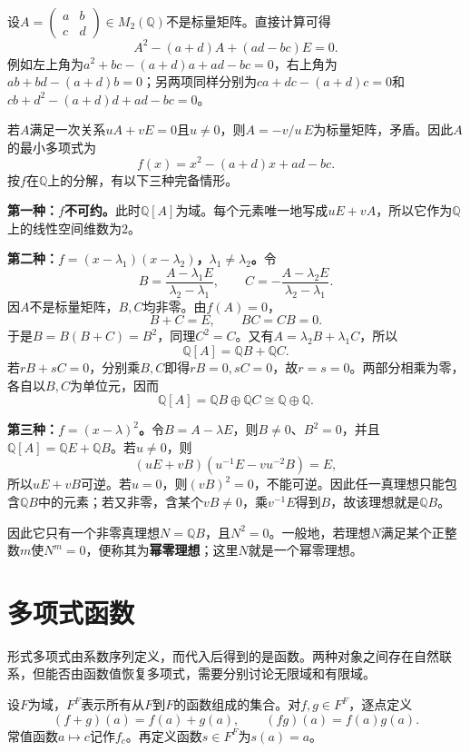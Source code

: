 \begin{example}
设$A=\begin{pmatrix}a&b\\c&d\end{pmatrix}\in M_2(\mathbb Q)$不是标量矩阵。直接计算可得
\[
A^2-(a+d)A+(ad-bc)E=0.
\]
例如左上角为$a^2+bc-(a+d)a+ad-bc=0$，右上角为$ab+bd-(a+d)b=0$；另两项同样分别为$ca+dc-(a+d)c=0$和$cb+d^2-(a+d)d+ad-bc=0$。

若$A$满足一次关系$uA+vE=0$且$u\ne0$，则$A=-v/u\,E$为标量矩阵，矛盾。因此$A$的最小多项式为
\[
f(x)=x^2-(a+d)x+ad-bc.
\]
按$f$在$\mathbb Q$上的分解，有以下三种完备情形。

\textbf{第一种：$f$不可约。}此时$\mathbb Q[A]$为域。每个元素唯一地写成$uE+vA$，所以它作为$\mathbb Q$上的线性空间维数为$2$。

\textbf{第二种：$f=(x-\lambda_1)(x-\lambda_2)$，$\lambda_1\ne\lambda_2$。}令
\[
B=\frac{A-\lambda_1E}{\lambda_2-\lambda_1},\qquad
C=-\frac{A-\lambda_2E}{\lambda_2-\lambda_1}.
\]
因$A$不是标量矩阵，$B,C$均非零。由$f(A)=0$，
\[
B+C=E,\qquad BC=CB=0.
\]
于是$B=B(B+C)=B^2$，同理$C^2=C$。又有$A=\lambda_2B+\lambda_1C$，所以
\[
\mathbb Q[A]=\mathbb QB+\mathbb QC.
\]
若$rB+sC=0$，分别乘$B,C$即得$rB=0,sC=0$，故$r=s=0$。两部分相乘为零，各自以$B,C$为单位元，因而
\[
\mathbb Q[A]=\mathbb QB\oplus\mathbb QC\cong\mathbb Q\oplus\mathbb Q.
\]

\textbf{第三种：$f=(x-\lambda)^2$。}令$B=A-\lambda E$，则$B\ne0$、$B^2=0$，并且$\mathbb Q[A]=\mathbb QE+\mathbb QB$。若$u\ne0$，则
\[
(uE+vB)\left(u^{-1}E-vu^{-2}B\right)=E,
\]
所以$uE+vB$可逆。若$u=0$，则$(vB)^2=0$，不能可逆。因此任一真理想只能包含$\mathbb QB$中的元素；若又非零，含某个$vB\ne0$，乘$v^{-1}E$得到$B$，故该理想就是$\mathbb QB$。

因此它只有一个非零真理想$N=\mathbb QB$，且$N^2=0$。一般地，若理想$N$满足某个正整数$m$使$N^m=0$，便称其为\textbf{幂零理想}；这里$N$就是一个幂零理想。
\end{example}


\section{多项式函数}

形式多项式由系数序列定义，而代入后得到的是函数。两种对象之间存在自然联系，但能否由函数值恢复多项式，需要分别讨论无限域和有限域。

\begin{definition}
设$F$为域，$F^F$表示所有从$F$到$F$的函数组成的集合。对$f,g\in F^F$，逐点定义
\[
(f+g)(a)=f(a)+g(a),\qquad(fg)(a)=f(a)g(a).
\]
常值函数$a\mapsto c$记作$f_c$。再定义函数$s\in F^F$为$s(a)=a$。
\end{definition}

